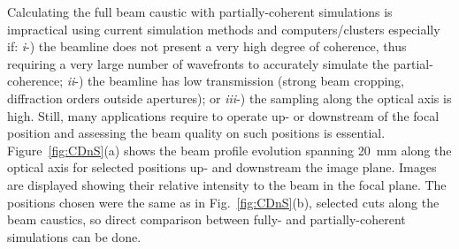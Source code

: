 \begin{refsection}
Calculating the full beam caustic with partially-coherent simulations is impractical using current simulation methods and computers/clusters especially if: \textit{i}-)  the beamline does not present a very high degree of coherence, thus requiring a very large number of wavefronts to accurately simulate the partial-coherence; \textit{ii}-) the beamline has low transmission (strong beam cropping, diffraction orders outside apertures); or \textit{iii}-) the sampling along the optical axis is high. Still, many applications require to operate up- or downstream of the focal position and assessing the beam quality on such positions is essential. Figure~\ref{fig:CDnS}(a) shows the beam profile evolution spanning 20~mm along the optical axis for selected positions up- and downstream the image plane. Images are displayed showing their relative intensity to the beam in the focal plane. The positions chosen were the same as in Fig.~\ref{fig:CDnS}(b), selected cuts along the beam caustics, so direct comparison between fully- and partially-coherent simulations can be done.

\clearpage


\end{refsection}
